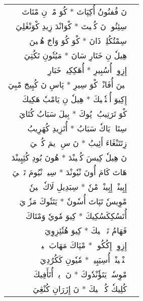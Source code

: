 \documentclass[a4paper, 12pt]{report}
\begin{document}
\begin{longtable}{rl}
\textarabic{نَ فُفنُونُ أُكِپَاتَ  *  كُوَ مْكٖ نِ مْتَاتَ} & \\ 
\textarabic{سِئِنُوكٖ نَ كُتٖيتَ  *  كْوَانْدَ زِيدِ كْوَنْڠَلِيَ} & \\ 
[8mm] 

\textarabic{سِمْتُكُلِيٖ ذَانَ  *  كْوَ كُوَ وَاجَ هُنٖينَ} & \\ 
\textarabic{هِيلٗ نِ خَتَارِ سَانَ  *  مَيُتٗونِ تَكُتِيَ} & \\ 
[8mm] 

\textarabic{إِزِوِيٖ أُسُبِيرِ  *  أُهَكِكِيشٖ خَبَارِ} & \\ 
\textarabic{تٖينَ أُفَانْيٖ كْوَ سِيرِ  *  پَاسِ نَ كُپِيجَ مْبِيَ} & \\ 
[8mm] 

\textarabic{إِكِيوَ أُمٖتٗشٖيكَ  *  هِيلٗ نِ يَامْبٗ هَكِيكَ} & \\ 
\textarabic{كْوَ تَرَتِيبُ إٖپُوكَ  *  بِيلَ سَبَابُ كُتَايَ} & \\ 
[8mm] 

\textarabic{سِتَايٖ يَاكٗ سَبَابُ  *  أُتَزِيدِ كُهَرِيبُ} & \\ 
\textarabic{زِتَتَنْڠَاءَ أَئِيبُ  *  نَ سِ وٖيمَ كُئٖنٖيَ} & \\ 
[8mm] 

\textarabic{نَ هِيلٗ كِيسَ كُتٖينْدَ  *  هُونَ بُودِ كُئِپِينْدَ} & \\ 
\textarabic{هَاتَ كَامَ أُونَ نْيٗونْدَ  *  سِيوٖ نْيُومَ تَرٖجٖيَ} & \\ 
[8mm] 

\textarabic{إِپِينْدٖ إِپِينْدٖ مْنٗ  *  سِبَدِيلِ لَاكٗ نٖينٗ} & \\ 
\textarabic{مْوِيسٗ تَپَاتَ أُسٗونٗ  *  يَتَتٗوكَ مَزٗوٖيَ} & \\ 
[8mm] 

\textarabic{أُتَسُكِكَسُكِيكَ  *  كِيوَ مٗويٗ وَمْتَاكَ} & \\ 
\textarabic{فَهَامُ تَفٖذٖهٖيكَ  *  كِيوَ هُتٗئِزِوِيَ} & \\ 
[8mm] 

\textarabic{إِزِوِيٖ إِكُكُوسٖ  *  مْپَاكَ مَهَابَ يٖيسٖ} & \\ 
\textarabic{پٖنْيٖينْيٖ أُسِيَپِيسٖ  *  مٗيٗونِ كَكُرُدِيَ} & \\ 
[8mm] 

\textarabic{مْوِسٗوٖ يَتَؤٗنْدٗوكَ  *  نَ وٖيوٖ أُتَأَفِيكَ} & \\ 
\textarabic{كُلِيكٗ كُفٖذٖهٖيكَ  *  نَ إِزَرَانِ كُنْڠِيَ} & \\ 
[8mm] 


\end{longtable}
\end{document}
